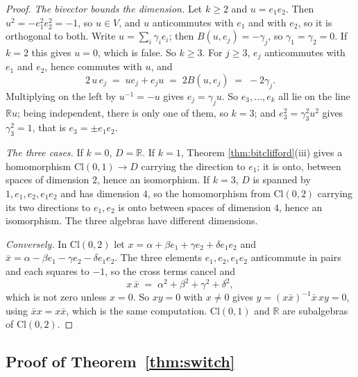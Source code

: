 \documentclass[11pt]{article}
\theoremstyle{plain}
\theoremstyle{definition}
\theoremstyle{plain}
\theoremstyle{definition}
\newcommand{\Cl}{\mathrm{Cl}}
\newcommand{\R}{\mathbb{R}}
\begin{document}
\begin{proof}
\emph{The bivector bounds the dimension.} Let $k \geq 2$ and $u = e_{1}e_{2}$. Then $u^{2} = -e_{1}^{2}e_{2}^{2} = -1$, so $u \in V$, and $u$ anticommutes with $e_{1}$ and with $e_{2}$, so it is orthogonal to both. Write $u = \sum_{i} \gamma_{i}e_{i}$; then $B(u, e_{j}) = -\gamma_{j}$, so $\gamma_{1} = \gamma_{2} = 0$. If $k = 2$ this gives $u = 0$, which is false. So $k \geq 3$. For $j \geq 3$, $e_{j}$ anticommutes with $e_{1}$ and $e_{2}$, hence commutes with $u$, and
\[
2\,u\,e_{j} \;=\; u e_{j} + e_{j} u \;=\; 2B(u, e_{j}) \;=\; -2\gamma_{j} .
\]
Multiplying on the left by $u^{-1} = -u$ gives $e_{j} = \gamma_{j}u$. So $e_{3}, \dots, e_{k}$ all lie on the line $\R u$; being independent, there is only one of them, so $k = 3$; and $e_{3}^{2} = \gamma_{3}^{2}u^{2}$ gives $\gamma_{3}^{2} = 1$, that is $e_{3} = \pm e_{1}e_{2}$.

\emph{The three cases.} If $k = 0$, $D = \R$. If $k = 1$, Theorem \ref{thm:bitclifford}(iii) gives a homomorphism $\Cl(0,1) \to D$ carrying the direction to $e_{1}$; it is onto, between spaces of dimension $2$, hence an isomorphism. If $k = 3$, $D$ is spanned by $1, e_{1}, e_{2}, e_{1}e_{2}$ and has dimension $4$, so the homomorphism from $\Cl(0,2)$ carrying its two directions to $e_{1}, e_{2}$ is onto between spaces of dimension $4$, hence an isomorphism. The three algebras have different dimensions.

\emph{Conversely.} In $\Cl(0,2)$ let $x = \alpha + \beta e_{1} + \gamma e_{2} + \delta e_{1}e_{2}$ and $\bar{x} = \alpha - \beta e_{1} - \gamma e_{2} - \delta e_{1}e_{2}$. The three elements $e_{1}, e_{2}, e_{1}e_{2}$ anticommute in pairs and each squares to $-1$, so the cross terms cancel and
\[
x\,\bar{x} \;=\; \alpha^{2} + \beta^{2} + \gamma^{2} + \delta^{2} ,
\]
which is not zero unless $x = 0$. So $xy = 0$ with $x \neq 0$ gives $y = (x\bar{x})^{-1}\bar{x}\,xy = 0$, using $\bar{x}x = x\bar{x}$, which is the same computation. $\Cl(0,1)$ and $\R$ are subalgebras of $\Cl(0,2)$.
\end{proof}

\subsection{\texorpdfstring{Proof of Theorem~\ref{thm:switch}}{Proof of Theorem 7.2}}\label{prf:thm:switch}
\end{document}
